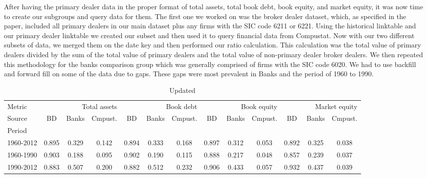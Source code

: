 \documentclass{article}
\begin{document}
After having the primary dealer data in the proper format of total assets, total book debt, book equity, and market equity, it was now time to create our subgroups and query data for them. The first one we worked on was the broker dealer dataset, which, as specified in the paper, included all primary dealers in our main dataset plus any firms with the SIC code 6211 or 6221. Using the historical linktable and our primary dealer linktable we created our subset and then used it to query financial data from Compustat. Now with our two different subsets of data, we merged them on the date key and then performed our ratio calculation. This calculation was the total value of primary dealers divided by the sum of the total value of primary dealers and the total value of non-primary dealer broker dealers. We then repeated this methodology for the banks comparison group which was generally comprised of firms with the SIC code 6020. We had to use backfill and forward fill on some of the data due to gaps. These gaps were most prevalent in Banks and the period of 1960 to 1990.
\par


    \begin{table}[htbp]
      \centering
      \caption{Updated}
      \label{tab:Table 2}
      \small
      \begin{tabular}{lcccccccccccc}
\toprule
Metric & \multicolumn{3}{r}{Total assets} & \multicolumn{3}{r}{Book debt} & \multicolumn{3}{r}{Book equity} & \multicolumn{3}{r}{Market equity} \\
Source & BD & Banks & Cmpust. & BD & Banks & Cmpust. & BD & Banks & Cmpust. & BD & Banks & Cmpust. \\
Period &  &  &  &  &  &  &  &  &  &  &  &  \\
\midrule
1960-2012 & 0.895 & 0.329 & 0.142 & 0.894 & 0.333 & 0.168 & 0.897 & 0.312 & 0.053 & 0.892 & 0.325 & 0.038 \\
1960-1990 & 0.903 & 0.188 & 0.095 & 0.902 & 0.190 & 0.115 & 0.888 & 0.217 & 0.048 & 0.857 & 0.239 & 0.037 \\
1990-2012 & 0.883 & 0.507 & 0.200 & 0.882 & 0.512 & 0.232 & 0.906 & 0.433 & 0.057 & 0.932 & 0.437 & 0.039 \\
\bottomrule
\end{tabular}

    \end{table}
    
\end{document}
